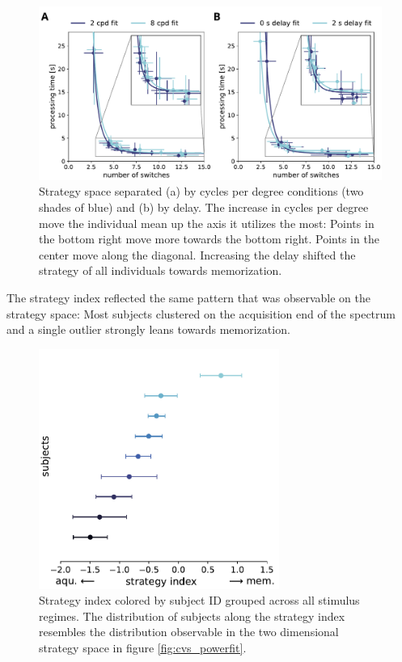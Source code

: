 \begin{figure}[h]
    \includegraphics[width=\textwidth]{Figures/comb.pdf}
    \caption[CVS powerfit cpd]{Strategy space separated (a) by cycles per degree conditions (two shades of blue) and (b) by delay. The increase in cycles per degree move the individual mean up the axis it utilizes the most: Points in the bottom right move more towards the bottom right. Points in the center move along the diagonal. Increasing the delay shifted the strategy of all individuals towards memorization.}
    \label{fig:cvs_powerfit_cpd}
\end{figure}

The strategy index reflected the same pattern that was observable on the strategy space: Most subjects clustered on the acquisition end of the spectrum and a single outlier strongly leans towards memorization.

\begin{figure}[H]
    \centering
    \includegraphics[width=0.7\textwidth]{Figures/stratidx.pdf}
    \caption[Strategy index overview]{Strategy index colored by subject ID grouped across all stimulus regimes. The distribution of subjects along the strategy index resembles the distribution observable in the two dimensional strategy space in figure \ref{fig:cvs_powerfit}.}
    \label{fig:strategy_index}
\end{figure}

